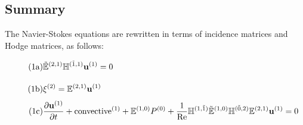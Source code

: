 \subsection{Summary}

The Navier-Stokes equations are rewritten in terms of incidence matrices and Hodge matrices, as follows:
\begin{align}
    \stepcounter{equation}
    \tag{{\theequation}a}
    &\tilde{\mathbb{E}}^{(2,1)} \mathbb{H}^{(\tilde{1},1)} \mathbf{u}^{(1)} = 0 \vphantom{\frac{\partial^{(1)}}{\partial}} \\
    \tag{{\theequation}b}
    &\xi^{(2)} = \mathbb{E}^{(2,1)} \mathbf{u}^{(1)} \vphantom{\frac{\partial^{(1)}}{\partial}} \\
    \tag{{\theequation}c}
    &\frac{\partial \mathbf{u}^{(1)}}{\partial t} + \text{convective}^{(1)} + \mathbb{E}^{(1,0)} P^{(0)} + \frac{1}{\text{Re}} \mathbb{H}^{(1,\tilde{1})} \tilde{\mathbb{E}}^{(1,0)} \mathbb{H}^{(\tilde{0},2)} \mathbb{E}^{(2,1)} \mathbf{u}^{(1)} = 0
\end{align}
